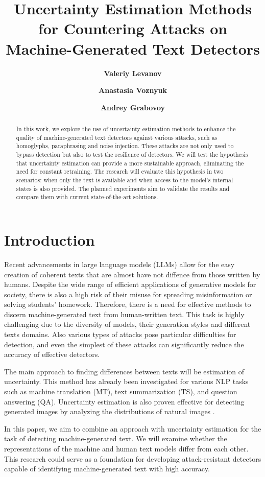 \documentclass[a4paper, 12pt]{article}
\title{Uncertainty Estimation Methods for Countering Attacks on Machine-Generated Text Detectors}
\author[1]{\textbf{Valeriy Levanov}}
\author[1]{\textbf{Anastasia Voznyuk}}
\author[1]{\textbf{Andrey Grabovoy}}
\affil[1]{\texttt{Moscow Institute of Physics and Technology, Moscow}}
\begin{document}
\maketitle



\begin{abstract}
	In this work, we explore the use of uncertainty estimation methods to enhance the quality of machine-generated text detectors against various attacks, such as homoglyphs, paraphrasing and noise injection. These attacks are not only used to bypass detection but also to test the resilience of detectors. We will test the hypothesis that uncertainty estimation can provide a more sustainable approach, eliminating the need for constant retraining. The research will evaluate this hypothesis in two scenarios: when only the text is available and when access to the model's internal states is also provided. The planned experiments aim to validate the results and compare them with current state-of-the-art solutions.
\end{abstract}

\section{Introduction}
Recent advancements in large language models (LLMs) allow for the easy creation of coherent texts that are almost have not diffence from those written by humans. Despite the wide range of efficient applications of generative models for society, there is also a high risk of their misuse for spreading misinformation or solving students' homework. Therefore, there is a need for effective methods to discern machine-generated text from human-written text. This task is highly challenging due to the diversity of models, their generation styles and different texts domains. Also various types of attacks pose particular difficulties for detection, and even the simplest of these attacks can significantly reduce the accuracy of effective detectors.

The main approach to finding differences between texts will be estimation of uncertainty. This method has already been investigated for various NLP tasks such as machine translation (MT), text summarization (TS), and question answering (QA)\citep{Polygraph}. Uncertainty estimation is also proven effective for detecting generated images by analyzing the distributions of natural images \citep{Image_uncertainty}.

In this paper, we aim to combine an approach with uncertainty estimation for the task of detecting machine-generated text. We will examine whether the representations of the machine and human text models differ from each other. This research could serve as a foundation for developing attack-resistant detectors capable of identifying machine-generated text with high accuracy.
\end{document}
